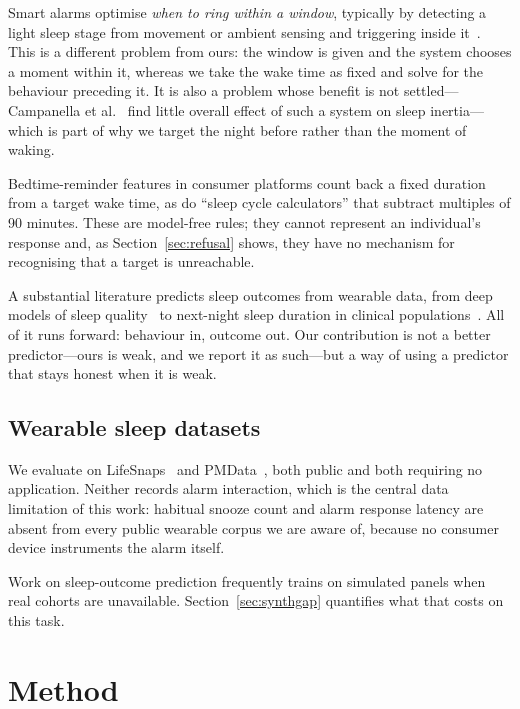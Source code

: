 \documentclass[conference]{IEEEtran}
\begin{document}
Smart alarms optimise \emph{when to ring within a window}, typically by
detecting a light sleep stage from movement or ambient sensing and triggering
inside it~\cite{smartalarm}. This is a different problem from ours: the window
is given and the system chooses a moment within it, whereas we take the wake
time as fixed and solve for the behaviour preceding it. It is also a problem
whose benefit is not settled---Campanella et al.~\cite{smartalarm} find little
overall effect of such a system on sleep inertia---which is part of why we
target the night before rather than the moment of waking.

Bedtime-reminder features in consumer platforms count back a fixed duration from
a target wake time, as do ``sleep cycle calculators'' that subtract multiples of
90 minutes. These are model-free rules; they cannot represent an individual's
response and, as Section~\ref{sec:refusal} shows, they have no mechanism for
recognising that a target is unreachable.

A substantial literature predicts sleep outcomes from wearable data, from deep
models of sleep quality~\cite{sathya} to next-night sleep duration in clinical
populations~\cite{fellger}. All of it runs forward: behaviour in, outcome out.
Our contribution is not a better predictor---ours is weak, and we report it as
such---but a way of using a predictor that stays honest when it is weak.

\subsection{Wearable sleep datasets}

We evaluate on LifeSnaps~\cite{lifesnaps} and PMData~\cite{pmdata}, both public
and both requiring no application. Neither records alarm interaction, which is
the central data limitation of this work: habitual snooze count and alarm
response latency are absent from every public wearable corpus we are aware of,
because no consumer device instruments the alarm itself.

Work on sleep-outcome prediction frequently trains on simulated panels when real
cohorts are unavailable. Section~\ref{sec:synthgap} quantifies what that costs
on this task.

\section{Method}
\label{sec:method}
\end{document}
